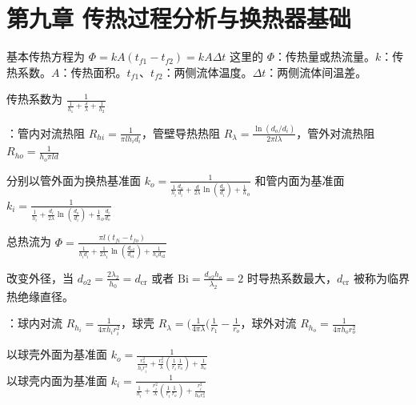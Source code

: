 \section{第九章 \quad 传热过程分析与换热器基础}


基本传热方程为 $\Phi=kA(t_{f1}-t_{f2})=kA\Delta t$ 这里的 $\Phi$：传热量或热流量。$k$：传热系数。$A$：传热面积。$t_{f1}$、$t_{f2}$：两侧流体温度。$\Delta t$：两侧流体间温差。


传热系数为 $\frac{1}{\frac{1}{h_1}+\frac{\delta}{\lambda}+\frac{1}{h_2}}$


：管内对流热阻 $R_{hi}=\frac{1}{\pi l h_id_i}$，管壁导热热阻 $R_\lambda =\frac{\ln(d_o/d_i)}{2\pi l\lambda}$，管外对流热阻 $R_{ho}=\frac{1}{h_o \pi l d}$

分别以管外面为换热基准面 $k_o=\frac{1}{\frac{1}{h_
            i}\frac{d_o}{d_i}+\frac{d}{2\lambda}\ln\left(\frac{d_o}{d_i}\right)+\frac{1}{h}_o}$ 和管内面为基准面 $k_i=\frac{1}{\frac{1}{h_i}+\frac{d_i}{2\lambda}\ln\left(\frac{d_o}{d_i}\right)+\frac{1}{h}_o\frac{d_i}{d_o}}$

总热流为 $\Phi = \frac{\pi l(t_{fi}-t_{fo})}{\frac{1}{h_id_i}+\frac{1}{2\lambda_1}\ln\left(\frac{d_{o2}}{d_{o1}}\right)+\frac{1}{h_od_{o2}}}$

改变外径，当 $d_{o2}=\frac{2\lambda_2}{h_0}=d_{\mathrm{cr}}$ 或者 $\mathrm{Bi}=\frac{d_{o2}h_o}{\lambda_2}=2$ 时导热系数最大，$d_\mathrm{cr}$ 被称为临界热绝缘直径。


：球内对流 $R_{h_i}=\frac{1}{4\pi h_i r_i^2}$，球壳 $R_{\lambda}=(\frac{1}{4\pi\lambda}(\frac{1}{r_1}-\frac{1}{r_o}$，球外对流 $R_{h_o}=\frac{1}{4\pi h_o r_o^2}$

以球壳外面为基准面 $k_o = \frac{1}{\frac{r_o^2}{h_i r_i^2} + \frac{r_o^2}{\lambda} \left( \frac{1}{r_i} \frac{1}{r_o} \right) + \frac{1}{h_o}}$\\ 以球壳内面为基准面 $k_i = \frac{1}{\frac{1}{h_i} + \frac{r_i^2}{\lambda} \left( \frac{1}{r_i} \frac{1}{r_o} \right) + \frac{r_i^2}{h_o r_o^2}}$


